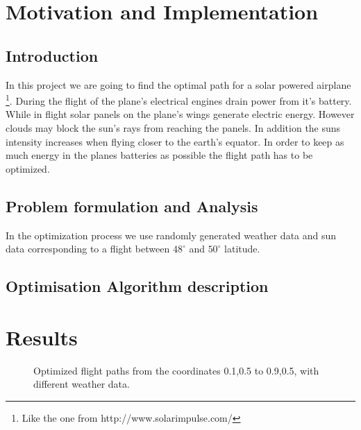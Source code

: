 \documentclass[ twoside,openright,titlepage,numbers=noenddot,headinclude,%
                footinclude=true,cleardoublepage=empty,abstractoff, %
                BCOR=5mm,paper=a4,fontsize=11pt,%
                ngerman,american,%
                ]{scrreprt}
\begin{document}
\frenchspacing
\raggedbottom
{} %
\pagestyle{plain}

%
\pagestyle{scrheadings}



\chapter{Motivation and Implementation}
\section{Introduction}
In this project we are going to find the optimal path for a solar powered airplane \footnote{Like the one from http://www.solarimpulse.com/}. During the flight of the plane's electrical engines drain power from it's battery. While in flight solar panels on the plane's wings generate electric energy. However clouds may block the sun's rays from reaching the panels. In addition the suns intensity increases when flying closer to the earth's equator. In order to keep as much energy in the planes batteries as possible the flight path has to be optimized.

\section{Problem formulation and Analysis}
In the optimization process we use randomly generated weather data and sun data corresponding to a flight between $48^\circ$ and $50^\circ$ latitude. 


\section{Optimisation Algorithm description}

\chapter{Results}
\begin{figure}


\caption{Optimized flight paths from the coordinates 0.1,0.5 to 0.9,0.5, with different weather data.}
\end{figure}
\end{document}

